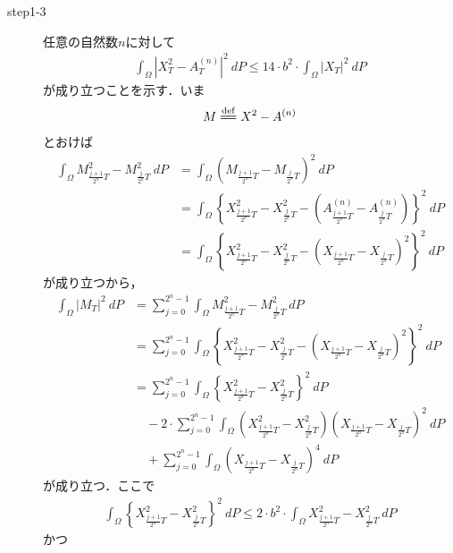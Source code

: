 \begin{sketch}
\begin{description}
			\item[step1-3]
				任意の自然数$n$に対して
				\begin{align}
					\int_\Omega \left|X_T^2 - A_T^{(n)}\right|^2\ dP
					\leq 14 \cdot b^2 \cdot \int_\Omega \left|X_T\right|^2\ dP
				\end{align}
				が成り立つことを示す．いま
				\begin{align}
					M \defeq X^2 - A^{(n)}
				\end{align}
				とおけば
				\begin{align}
					\int_\Omega M_{\frac{j+1}{2^n}T}^2 - M_{\frac{j}{2^n}T}^2\ dP
					&= \int_\Omega \left(M_{\frac{j+1}{2^n}T} - M_{\frac{j}{2^n}T} \right)^2\ dP \\
					&= \int_\Omega \left\{ X^2_{\frac{j+1}{2^n}T} - X^2_{\frac{j}{2^n}T} -
					\left(A^{(n)}_{\frac{j+1}{2^n}T} - A^{(n)}_{\frac{j}{2^n}T}\right) \right\}^2\ dP \\
					&= \int_\Omega \left\{ X^2_{\frac{j+1}{2^n}T} - X^2_{\frac{j}{2^n}T} -
					\left(X_{\frac{j+1}{2^n}T} - X_{\frac{j}{2^n}T}\right)^2 \right\}^2\ dP
				\end{align}
				が成り立つから，
				\begin{align}
					\int_\Omega \left|M_T\right|^2\ dP
					&= \sum_{j=0}^{2^n-1} \int_\Omega M_{\frac{j+1}{2^n}T}^2 - M_{\frac{j}{2^n}T}^2\ dP \\
					&= \sum_{j=0}^{2^n-1} \int_\Omega \left\{ X^2_{\frac{j+1}{2^n}T} - X^2_{\frac{j}{2^n}T} -
					\left(X_{\frac{j+1}{2^n}T} - X_{\frac{j}{2^n}T}\right)^2 \right\}^2\ dP \\
					&= \sum_{j=0}^{2^n-1} \int_\Omega \left\{ X^2_{\frac{j+1}{2^n}T} - X^2_{\frac{j}{2^n}T} \right\}^2\ dP \\
						&\quad - 2 \cdot \sum_{j=0}^{2^n-1} \int_\Omega \left( X^2_{\frac{j+1}{2^n}T} - X^2_{\frac{j}{2^n}T} \right) \left(X_{\frac{j+1}{2^n}T} - X_{\frac{j}{2^n}T}\right)^2\ dP \\
						&\quad + \sum_{j=0}^{2^n-1} \int_\Omega \left(X_{\frac{j+1}{2^n}T} - X_{\frac{j}{2^n}T}\right)^4\ dP
					\label{fom:thm_decomposition_of_square_integrable_martingales_1}
				\end{align}
				が成り立つ．ここで
				\begin{align}
					\int_\Omega \left\{ X^2_{\frac{j+1}{2^n}T} - X^2_{\frac{j}{2^n}T} \right\}^2\ dP
					\leq 2 \cdot b^2 \cdot \int_\Omega X^2_{\frac{j+1}{2^n}T} - X^2_{\frac{j}{2^n}T}\ dP
				\end{align}
				かつ
				\begin{align}

\end{align}
\end{description}
\end{sketch}

